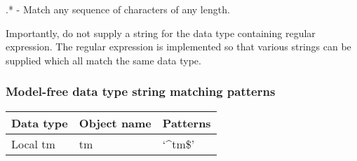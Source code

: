     .* - Match any sequence of characters of any length.

Importantly, do not supply a string for the data type containing regular expression.  The
regular expression is implemented so that various strings can be supplied which all match
the same data type.


\subsubsection{Model-free data type string matching patterns}



\begin{center}
\begin{tabular}{lll}
\toprule
Data type & Object name & Patterns \\
\midrule
 Local tm                &  tm            &  `\^{}tm\$'                                            \\
\bottomrule
\end{tabular}
\end{center}

